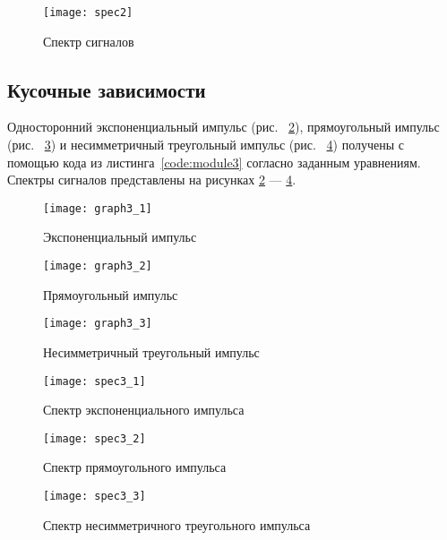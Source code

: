 \begin{figure}[H]
	\begin{center}
		\texttt{[image: spec2]}
		\caption{Спектр сигналов} 
		\label{pic:spec2} %
	\end{center}
\end{figure}
\subsection{Кусочные зависимости}

Односторонний экспоненциальный импульс (рис. ~\ref{pic:graph3_1}), прямоугольный импульс (рис. ~\ref{pic:graph3_2}) и несимметричный треугольный импульс (рис. ~\ref{pic:graph3_3}) получены с помощью кода из листинга~\ref{code:module3} согласно заданным уравнениям. Спектры сигналов представлены на рисунках \ref{pic:graph3_1} — \ref{pic:graph3_3}.

\begin{figure}[H]
	\begin{center}
		\texttt{[image: graph3\_1]}
		\caption{Экспоненциальный импульс} 
		\label{pic:graph3_1} %
	\end{center}
\end{figure}
\begin{figure}[H]
	\begin{center}
		\texttt{[image: graph3\_2]}
		\caption{Прямоугольный импульс} 
		\label{pic:graph3_2} %
	\end{center}
\end{figure}
\begin{figure}[H]
	\begin{center}
		\texttt{[image: graph3\_3]}
		\caption{Несимметричный треугольный импульс} 
		\label{pic:graph3_3} %
	\end{center}
\end{figure}

\begin{figure}[H]
	\begin{center}
		\texttt{[image: spec3\_1]}
		\caption{Спектр экспоненциального импульса} 
		\label{pic:spec3_1} %
	\end{center}
\end{figure}
\begin{figure}[H]
	\begin{center}
		\texttt{[image: spec3\_2]}
		\caption{Спектр прямоугольного импульса} 
		\label{pic:spec3_2} %
	\end{center}
\end{figure}
\begin{figure}[H]
	\begin{center}
		\texttt{[image: spec3\_3]}
		\caption{Спектр несимметричного треугольного импульса} 
		\label{pic:spec3_3} %
	\end{center}
\end{figure}

